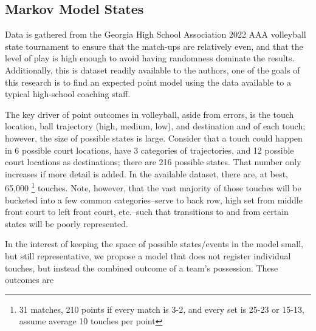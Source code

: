 \documentclass{IOS-Book-Article}
\begin{document}
\subsection{Markov Model States}

Data is gathered from the Georgia High School Association 2022 AAA volleyball state tournament to 
ensure that the match-ups are relatively even, and that the level of play is high enough to avoid 
having randomness dominate the results.  Additionally, this is dataset readily available to the 
authors, one of the goals of this research is to find an expected point model using the data
available to a typical high-school coaching staff.

The key driver of point outcomes in volleyball, aside from errors, is the touch location, ball 
trajectory (high, medium, low), and destination and  of each touch; however, the size of possible 
states is large. Consider that a touch could happen in 6 possible court locations, have 3 
categories of trajectories, and 12 possible court locations as destinations; there are 216 
possible states. That number only increases if more detail is added.  In the available dataset, 
there are, at best, 65,000 \footnote{31 matches, 210 points if every match is 3-2, and every set 
is 25-23 or 15-13, assume average 10 touches per point} touches. Note, however, that the vast 
majority of those touches will be bucketed into a few common categories--serve to back row, high 
set from middle front court to left front court, etc.--such that transitions to and from certain 
states will be poorly represented.

In the interest of keeping the space of possible states/events in the model small, but still 
representative, we propose a model that does not register individual touches, but instead the
combined outcome of a team's possession.  These outcomes are
\end{document}
